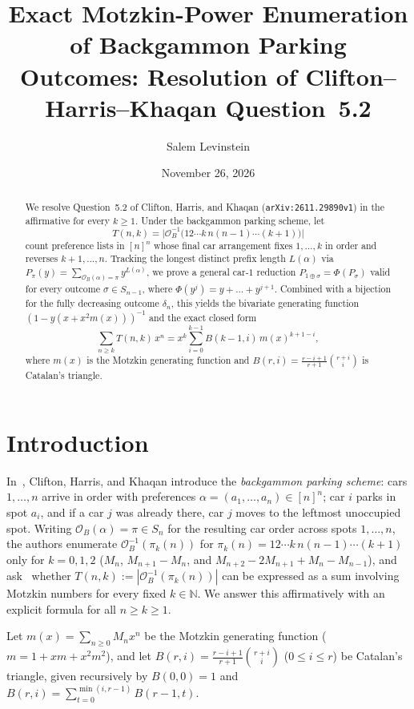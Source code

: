\documentclass[11pt]{article}
\title{Exact Motzkin-Power Enumeration of Backgammon Parking Outcomes: Resolution of Clifton--Harris--Khaqan Question~5.2}
\author{Salem Levinstein}
\date{November 26, 2026}
\begin{document}
\maketitle

\begin{abstract}
We resolve Question~5.2 of Clifton, Harris, and Khaqan (\texttt{arXiv:2611.29890v1}) in the affirmative for every $k \ge 1$. Under the backgammon parking scheme, let
\[
  T(n, k) = \bigl|\mathcal{O}_B^{-1}\bigl(12\cdots k\, n(n-1)\cdots(k+1)\bigr)\bigr|
\]
count preference lists in $[n]^n$ whose final car arrangement fixes $1, \dots, k$ in order and reverses $k + 1, \dots, n$. Tracking the longest distinct prefix length $L(\alpha)$ via $P_\pi(y) = \sum_{\mathcal{O}_B(\alpha) = \pi} y^{L(\alpha)}$, we prove a general car-$1$ reduction $P_{1 \oplus \sigma} = \Phi(P_\sigma)$ valid for every outcome $\sigma \in S_{n-1}$, where $\Phi(y^j) = y + \dots + y^{j+1}$. Combined with a bijection for the fully decreasing outcome $\delta_n$, this yields the bivariate generating function $(1 - y(x + x^2 m(x)))^{-1}$ and the exact closed form
\[
  \sum_{n \ge k} T(n, k)\, x^n = x^k \sum_{i=0}^{k-1} B(k - 1, i)\, m(x)^{k + 1 - i},
\]
where $m(x)$ is the Motzkin generating function and $B(r, i) = \frac{r - i + 1}{r + 1}\binom{r + i}{i}$ is Catalan's triangle.
\end{abstract}

\section{Introduction}

In~\cite{CHK2026}, Clifton, Harris, and Khaqan introduce the \emph{backgammon parking scheme}: cars $1, \dots, n$ arrive in order with preferences $\alpha = (a_1, \dots, a_n) \in [n]^n$; car $i$ parks in spot $a_i$, and if a car $j$ was already there, car $j$ moves to the leftmost unoccupied spot. Writing $\mathcal{O}_B(\alpha) = \pi \in S_n$ for the resulting car order across spots $1, \dots, n$, the authors enumerate $\mathcal{O}_B^{-1}(\pi_k(n))$ for $\pi_k(n) = 12\cdots k\, n(n-1)\cdots(k+1)$ only for $k = 0, 1, 2$ ($M_n$, $M_{n+1} - M_n$, and $M_{n+2} - 2M_{n+1} + M_n - M_{n-1}$), and ask~\cite[Question~5.2]{CHK2026} whether $T(n, k) := |\mathcal{O}_B^{-1}(\pi_k(n))|$ can be expressed as a sum involving Motzkin numbers for every fixed $k \in \mathbb{N}$. We answer this affirmatively with an explicit formula for all $n \ge k \ge 1$.

Let $m(x) = \sum_{n \ge 0} M_n x^n$ be the Motzkin generating function ($m = 1 + xm + x^2 m^2$), and let $B(r, i) = \frac{r - i + 1}{r + 1}\binom{r + i}{i}$ ($0 \le i \le r$) be Catalan's triangle, given recursively by $B(0, 0) = 1$ and $B(r, i) = \sum_{t=0}^{\min(i, r - 1)} B(r - 1, t)$.
\end{document}
